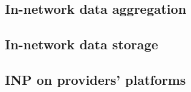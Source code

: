 \subsection{In-network data aggregation}


\subsection{In-network data storage}


\subsection{INP on providers' platforms}
